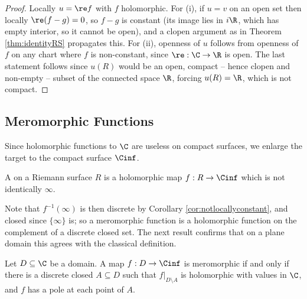 \begin{proof}
	Locally $u = \re f$ with $f$ holomorphic. For (i), if $u = v$ on an open set then
	locally $\re(f - g) = 0$, so $f - g$ is constant (its image lies in $i\R$, which has
	empty interior, so it cannot be open), and a clopen argument as in Theorem
	\ref{thm:identityRS} propagates this. For (ii), openness of $u$ follows from openness of
	$f$ on any chart where $f$ is non-constant, since $\re : \C \to \R$ is open. The last
	statement follows since $u(R)$ would be an open, compact -- hence clopen and non-empty
	-- subset of the connected space $\R$, forcing $u(R) = \R$, which is not compact.
\end{proof}

\subsection{Meromorphic Functions}

Since holomorphic functions to $\C$ are useless on compact surfaces, we enlarge the target
to the compact surface $\Cinf$.

\begin{definition}
	A  on a Riemann surface $R$ is a holomorphic map
	$f : R \to \Cinf$ which is not identically $\infty$.
\end{definition}

Note that $f^{-1}(\infty)$ is then discrete by Corollary \ref{cor:notlocallyconstant}, and
closed since $\{\infty\}$ is; so a meromorphic function is a holomorphic function on the
complement of a discrete closed set. The next result confirms that on a plane domain this
agrees with the classical definition.

\begin{proposition}\label{prop:meroplane}
	Let $D \subseteq \C$ be a domain. A map $f : D \to \Cinf$ is meromorphic if and only if
	there is a discrete closed $A \subseteq D$ such that $f|_{D\setminus A}$ is holomorphic
	with values in $\C$, and $f$ has a pole at each point of $A$.
\end{proposition}

